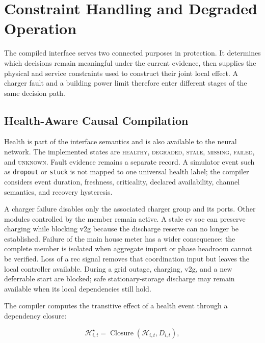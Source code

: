 \section{Constraint Handling and Degraded Operation}
\label{sec:tcg-safety}

The compiled interface serves two connected purposes in protection. It determines which decisions remain meaningful under the current evidence, then supplies the physical and service constraints used to construct their joint local effect. A charger fault and a building power limit therefore enter different stages of the same decision path.

\subsection{Health-Aware Causal Compilation}
\label{sec:timarl-health}

Health is part of the interface semantics and is also available to the neural network. The implemented states are \textsc{healthy}, \textsc{degraded}, \textsc{stale}, \textsc{missing}, \textsc{failed}, and \textsc{unknown}. Fault evidence remains a separate record. A simulator event such as \texttt{dropout} or \texttt{stuck} is not mapped to one universal health label; the compiler considers event duration, freshness, criticality, declared availability, channel semantics, and recovery hysteresis.

A charger failure disables only the associated charger group and its ports. Other modules controlled by the member remain active. A stale \gls{ev} \gls{soc} can preserve charging while blocking \gls{v2g} because the discharge reserve can no longer be established. Failure of the main house meter has a wider consequence: the complete member is isolated when aggregate import or phase headroom cannot be verified. Loss of a \gls{rec} signal removes that coordination input but leaves the local controller available. During a grid outage, charging, \gls{v2g}, and a new deferrable start are blocked; safe stationary-storage discharge may remain available when its local dependencies still hold.

The compiler computes the transitive effect of a health event through a dependency closure:

\begin{equation}
\mathcal{H}^{\star}_{i,t}
=
\operatorname{Closure}
\left(
\mathcal{H}_{i,t},D_{i,t}
\right),
\label{eq:health-closure}
\end{equation}

